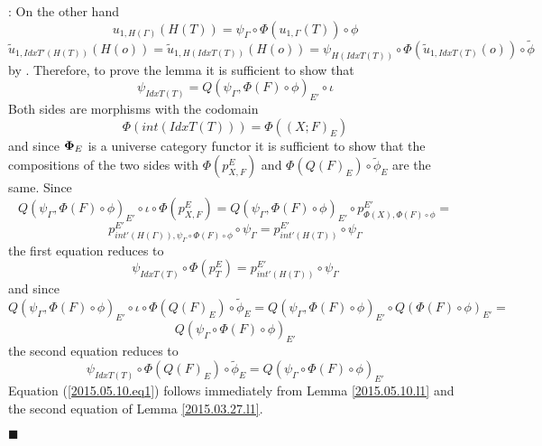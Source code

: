 \documentclass[12pt]{article}
\numberwithin{equation}{section}
\newenvironment{eq}{\begin{equation}}{\end{equation}}
\newenvironment{myproof}{{\bf Proof}:}{$\blacksquare$ \vskip 5mm }
\newcommand{\llabel}[1]{\label{#1}}
\newcommand{\wt}{\widetilde}
\begin{document}
\begin{myproof}
On the other hand
%
$$u_{1,H(\Gamma)}(H(T))=\psi_{\Gamma}\circ \Phi(u_{1,\Gamma}(T))\circ \phi$$
$$\wt{u}_{1,IdxT'(H(T))}(H(o))=\wt{u}_{1,H(IdxT(T))}(H(o))=\psi_{H(IdxT(T))}\circ
\Phi(\wt{u}_{1,IdxT(T)}(o))\circ \wt{\phi}$$
%
by \cite[Lemma 6.1(1,2)]{fromunivwithPi}. Therefore, to prove the lemma it is
sufficient to show that
%
$$\psi_{IdxT(T)}=Q(\psi_{\Gamma},\Phi(F)\circ\phi)_{E'}\circ\iota$$
%
Both sides are morphisms with the codomain
%
$$\Phi(int(IdxT(T)))=\Phi((X;F)_E)$$
%
and since ${\bf\Phi}_E$ is a universe category functor it is sufficient to show
that the compositions of the two sides with $\Phi(p^E_{X,F})$ and
$\Phi(Q(F)_E)\circ \wt{\phi}_E$ are the same. Since
%
$$Q(\psi_{\Gamma},\Phi(F)\circ\phi)_{E'}\circ\iota\circ
\Phi(p^E_{X,F})=Q(\psi_{\Gamma},\Phi(F)\circ\phi)_{E'}\circ
p^{E'}_{\Phi(X),\Phi(F)\circ\phi}=$$
$$p^{E'}_{int'(H(\Gamma)),\psi_{\Gamma}\circ
  \Phi(F)\circ\phi}\circ\psi_{\Gamma}=p^{E'}_{int'(H(T))}\circ\psi_{\Gamma}$$
%
the first equation reduces to
%
\begin{eq}
\llabel{2015.05.10.eq1} \psi_{IdxT(T)}\circ
\Phi(p^E_{T})=p^{E'}_{int'(H(T))}\circ\psi_{\Gamma}
\end{eq}
%
and since
%
$$Q(\psi_{\Gamma},\Phi(F)\circ\phi)_{E'}\circ\iota\circ \Phi(Q(F)_E)\circ
\wt{\phi}_E=Q(\psi_{\Gamma},\Phi(F)\circ\phi)_{E'}\circ
Q(\Phi(F)\circ\phi)_{E'}=$$$$Q(\psi_{\Gamma}\circ \Phi(F)\circ \phi)_{E'}$$
%
the second equation reduces to
%
\begin{eq}
\llabel{2015.05.10.eq2.0} \psi_{IdxT(T)}\circ \Phi(Q(F)_E)\circ
\wt{\phi}_E=Q(\psi_{\Gamma}\circ \Phi(F)\circ \phi)_{E'}
\end{eq}
%
Equation (\ref{2015.05.10.eq1}) follows immediately from Lemma
\ref{2015.05.10.l1} and the second equation of Lemma \ref{2015.03.27.l1}.


\end{myproof}
\end{document}
